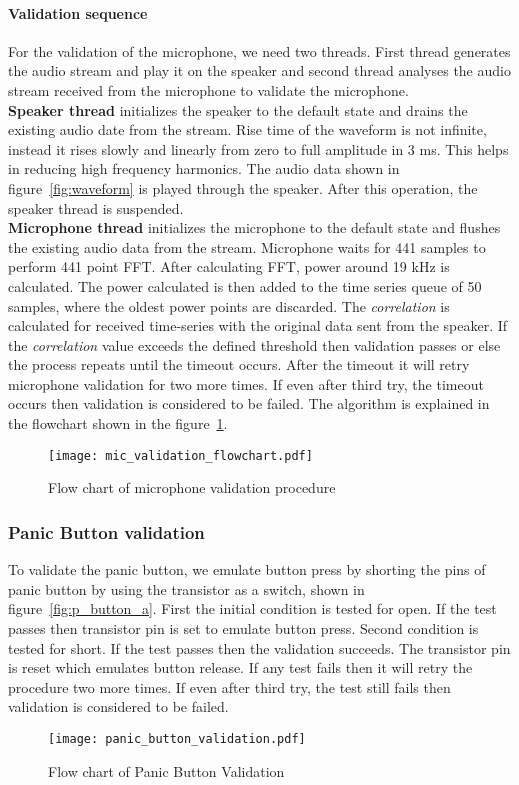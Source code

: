 \paragraph{Validation sequence\\}
For the validation of the microphone, we need two threads. First thread generates the audio stream and play it on the speaker and second thread analyses the audio stream received from the microphone to validate the microphone.\\
\textbf{Speaker thread} initializes the speaker to the default state and drains the existing audio date from the stream. Rise time of the waveform is not infinite, instead it rises slowly and linearly from zero to full amplitude in 3 ms. This helps in reducing high frequency harmonics. The audio data shown in figure~\ref{fig:waveform} is played through the speaker. After this operation, the speaker thread is suspended.\\
\textbf{Microphone thread} initializes the microphone to the default state and flushes the existing audio data from the stream. Microphone waits for 441 samples to perform 441 point FFT. After calculating FFT, power around 19 kHz is calculated. The power calculated is then added to the time series queue of 50 samples, where the oldest power points are discarded. The \emph{correlation} is calculated for received time-series with the original data sent from the speaker. If the \emph{correlation} value exceeds the defined threshold then validation passes or else the process repeats until the timeout occurs. After the timeout it will retry microphone validation for two more times. If even after third try, the timeout occurs then validation is considered to be failed. The algorithm is explained in the flowchart shown in the figure~\ref{fig:mic_validation_flowchart}.
\begin{figure}[H]
\centering
\texttt{[image: mic\_validation\_flowchart.pdf]}
\caption{Flow chart of microphone validation procedure}
\label{fig:mic_validation_flowchart}
\end{figure}
\subsubsection{Panic Button validation}
To validate the panic button, we emulate button press by shorting the pins of panic button by using the transistor as a switch, shown in figure~\ref{fig:p_button_a}. First the initial condition is tested for open. If the test passes then transistor pin is set to emulate button press. Second condition is tested for short. If the test passes then the validation succeeds. The transistor pin is reset which emulates button release. If any test fails then it will retry the procedure two more times. If even after third try, the test still fails then validation is considered to be failed. 
\begin{figure}[H]
\centering
\texttt{[image: panic\_button\_validation.pdf]}
\caption{Flow chart of Panic Button Validation}
\label{fig:panic_button_validation}
\end{figure}
